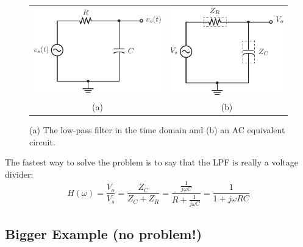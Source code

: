 \begin{figure}[tb]
\begin{center}
\begin{tabular}{cc}
\includegraphics[angle=-0.0,scale=1]{mod1_3_5_rc_lpf} &
\includegraphics[angle=-0.0,scale=1]{mod1_3_6_rc_lpf_Z} \\
(a) & (b) \\
\end{tabular}
\end{center}
\caption{(a) The low-pass filter in the time domain and (b) an AC equivalent circuit.} \label{fig:lpfagain}
\end{figure}


The fastest way to solve the problem is to say that the LPF is really a voltage divider:
\begin{equation}
H(\omega ) = \frac{{{V_o}}}{{{V_s}}} = \frac{{{Z_C}}}{{{Z_C} + {Z_R}}} = \frac{{\frac{1}{{j\omega C}}}}{{R + \frac{1}{{j\omega C}}}} = \frac{1}{{1 + j\omega RC}}
\end{equation}




\subsection{Bigger Example (no problem!)}

